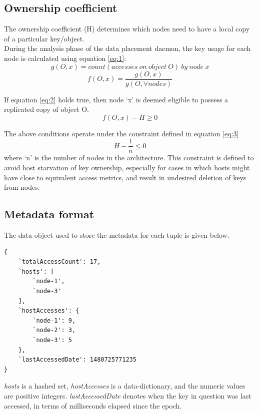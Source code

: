 \documentclass{sig-alternate}
\begin{document}
\subsection{Ownership coefficient} \label{Ownership-coefficient}
The ownership coefficient (H) determines which nodes need to have a local copy of a particular key/object.\\

During the analysis phase of the data placement daemon, the key usage for each node is calculated using equation \ref{eq:1}:
\begin{equation*}g(O, x) = count(accesses\ on\ object\ O)\ by\ node\ x \end{equation*}
\begin{equation} \label{eq:1} f(O,x) = \frac{g(O, x)}{g(O, \forall nodes)} \end{equation}

If equation \ref{eq:2} holds true, then node `x' is deemed eligible to possess a replicated copy of object O.
\begin{equation} \label{eq:2} f(O, x) - H \geq 0 \end{equation}

The above conditions operate under the constraint defined in equation \ref{eq:3}
\begin{equation} \label{eq:3} H - \frac{1}{n} \leq 0 \end{equation}
where `n' is the number of nodes in the architecture. This constraint is defined to avoid host starvation of key ownership, especially for cases in which hosts might have close to equivalent access metrics, and result in undesired deletion of keys from nodes.\\


\subsection{Metadata format}
The data object used to store the metadata for each tuple is given below.
\begin{lstlisting}
{
    `totalAccessCount': 17,
    `hosts': [
        `node-1',
        `node-3'
    ],
    `hostAccesses': {
        `node-1': 9,
        `node-2': 3,
        `node-3': 5
    },
    `lastAccessedDate': 1480725771235
}
\end{lstlisting}
\textit{hosts} is a hashed set, \textit{hostAccesses} is a data-dictionary, and the numeric values are positive integers. \textit{lastAccessedDate} denotes when the key in question was last accessed, in terms of milliseconds elapsed since the epoch.\\
\end{document}
